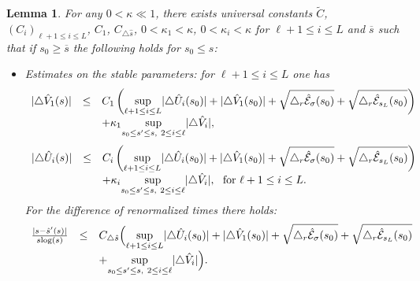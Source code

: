 \documentclass[11pt,a4paper,reqno]{amsart}
\newtheorem{lemma}[theorem]{Lemma}
\theoremstyle{remark}
\numberwithin{equation}{section}
\begin{document}
\begin{lemma} \label{variete:lem:bootstrap differences}
For any $0<\kappa \ll 1$, there exists universal constants $\tilde{C}$, $(C_i)_{\ell +1\leq i \leq L}$, $C_1$, $C_{\triangle \hat{s}}$, $0<\kappa_1<\kappa$, $0<\kappa_i<\kappa$ for $\ell+1 \leq i\leq L$ and ${{\overline {s}}}$ such that if $s_0\geq {{\overline {s}}}$ the following holds for $s_0\leq s$:
\begin{itemize}
\item[(i)] \emph{Estimates on the stable parameters:} for $\ell+1\leq i \leq L$ one has
\begin{equation} \label{variete:eq:bootstrap V1}
\begin{array}{r c l}
|\triangle \hat{V}_1(s)| &\leq& C_1\left( \underset{\ell+1\leq i \leq L}{\text{sup}}|\triangle \hat{U}_i(s_0)| + |\triangle \hat{V}_1(s_0)|+\sqrt{\triangle_r \hat{\mathcal{E}}_{\sigma}(s_0)}+\sqrt{\triangle_r \hat{\mathcal{E}}_{s_L}(s_0)}\right)\\
&&+ \kappa_1 \underset{s_0\leq s' \leq s, \ 2\leq i \leq \ell}{\text{sup}}|\triangle \hat{V}_i|,
\end{array}
\end{equation}
\begin{equation} \label{variete:eq:bootstrap Ui}
\begin{array}{r c l}
|\triangle \hat{U}_i(s)| &\leq& C_i\left( \underset{\ell+1\leq i \leq L}{\text{sup}}|\triangle \hat{U}_i(s_0)| + |\triangle \hat{V}_1(s_0)|+\sqrt{\triangle_r \hat{\mathcal{E}}_{\sigma}(s_0)}+\sqrt{\triangle_r \hat{\mathcal{E}}_{s_L}(s_0)}\right)\\
&&+ \kappa_i \underset{s_0\leq s' \leq s, \ 2\leq i \leq \ell}{\text{sup}}|\triangle \hat{V}_i|, \ \ \text{for} \ \ell+1\leq i \leq L.
\end{array}
\end{equation}
For the difference of renormalized times there holds:
\begin{equation} \label{variete:eq:bootstrap s-hats'}
\begin{array}{r c l}
\frac{|s-\hat{s}'(s)|}{s\text{log}(s)} &\leq& C_{\triangle \hat{s}}\Bigl{(} \underset{\ell+1\leq i \leq L}{\text{sup}}|\triangle \hat{U}_i(s_0)| + |\triangle \hat{V}_1(s_0)|+\sqrt{\triangle_r \hat{\mathcal{E}}_{\sigma}(s_0)}+\sqrt{\triangle_r \hat{\mathcal{E}}_{s_L}(s_0)}\\
&& + \underset{s_0\leq s' \leq s, \ 2\leq i \leq \ell}{\text{sup}}|\triangle \hat{V}_i|\Bigr{)}.
\end{array}
\end{equation}

\end{itemize}
\end{lemma}
\end{document}
